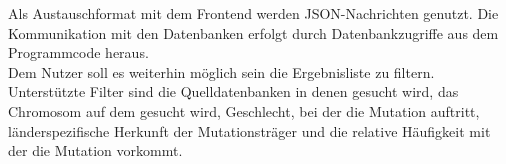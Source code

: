 Als Austauschformat mit dem Frontend werden JSON-Nachrichten genutzt. Die Kommunikation mit den Datenbanken erfolgt durch Datenbankzugriffe aus dem Programmcode heraus.\\
Dem Nutzer soll es weiterhin möglich sein die Ergebnisliste zu filtern. Unterstützte Filter sind die Quelldatenbanken in denen gesucht wird, das Chromosom auf dem gesucht wird, Geschlecht, bei der die Mutation auftritt, länderspezifische Herkunft der Mutationsträger und die relative Häufigkeit mit der die Mutation vorkommt.

